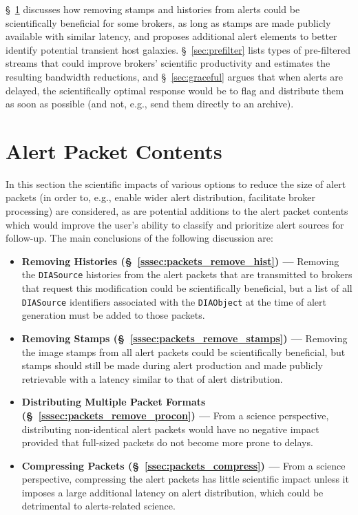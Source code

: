 \documentclass[DM,lsstdraft,authoryear,toc]{lsstdoc}
\begin{document}
\S~\ref{sec:packets} discusses how removing stamps and histories from alerts could be scientifically beneficial for some brokers, as long as stamps are made publicly available with similar latency, and proposes additional alert elements to better identify potential transient host galaxies.
\S~\ref{sec:prefilter} lists types of pre-filtered streams that could improve brokers' scientific productivity and estimates the resulting bandwidth reductions, and \S~\ref{sec:graceful} argues that when alerts are delayed, the scientifically optimal response would be to flag and distribute them as soon as possible (and not, e.g., send them directly to an archive).

\clearpage
\section{Alert Packet Contents} \label{sec:packets}

In this section the scientific impacts of various options to reduce the size of alert packets (in order to, e.g., enable wider alert distribution, facilitate broker processing) are considered, as are potential additions to the alert packet contents which would improve the user's ability to classify and prioritize alert sources for follow-up.
The main conclusions of the following discussion are:
\begin{itemize}
\item {\bf Removing Histories (\S~\ref{sssec:packets_remove_hist}) ---} Removing the {\tt DIASource} histories from the alert packets that are transmitted to brokers that request this modification could be scientifically beneficial, but a list of all {\tt DIASource} identifiers associated with the {\tt DIAObject} at the time of alert generation must be added to those packets. 
\item {\bf Removing Stamps (\S~\ref{sssec:packets_remove_stamps}) ---} Removing the image stamps from all alert packets could be scientifically beneficial, but stamps should still be made during alert production and made publicly retrievable with a latency similar to that of alert distribution.
\item {\bf Distributing Multiple Packet Formats (\S~\ref{sssec:packets_remove_procon}) ---} From a science perspective, distributing non-identical alert packets would have no negative impact provided that full-sized packets do not become more prone to delays.
\item {\bf Compressing Packets (\S~\ref{ssec:packets_compress}) ---} From a science perspective, compressing the alert packets has little scientific impact unless it imposes a large additional latency on alert distribution, which could be detrimental to alerts-related science.
\end{itemize}
\end{document}
